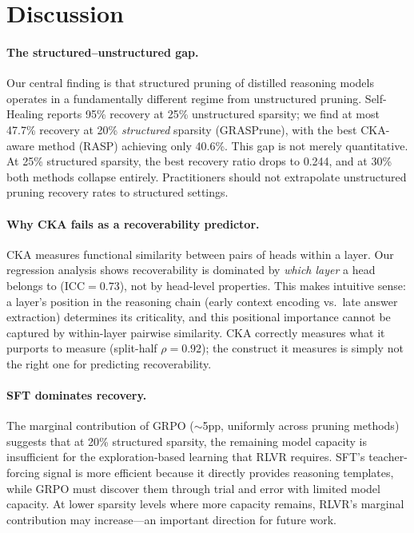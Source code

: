\documentclass[11pt,a4paper]{article}
\begin{document}
\section{Discussion}
\label{sec:discussion}

\paragraph{The structured--unstructured gap.}
Our central finding is that structured pruning of distilled reasoning models operates in a fundamentally different regime from unstructured pruning.
Self-Healing \cite{selfhealing2025} reports 95\% recovery at 25\% unstructured sparsity; we find at most 47.7\% recovery at 20\% \emph{structured} sparsity (GRASPrune), with the best CKA-aware method (RASP) achieving only 40.6\%.
This gap is not merely quantitative.
At 25\% structured sparsity, the best recovery ratio drops to 0.244, and at 30\% both methods collapse entirely.
Practitioners should not extrapolate unstructured pruning recovery rates to structured settings.

\paragraph{Why CKA fails as a recoverability predictor.}
CKA measures functional similarity between pairs of heads within a layer.
Our regression analysis shows recoverability is dominated by \emph{which layer} a head belongs to (ICC$=0.73$), not by head-level properties.
This makes intuitive sense: a layer's position in the reasoning chain (early context encoding vs.\ late answer extraction) determines its criticality, and this positional importance cannot be captured by within-layer pairwise similarity.
CKA correctly measures what it purports to measure (split-half $\rho = 0.92$); the construct it measures is simply not the right one for predicting recoverability.

\paragraph{SFT dominates recovery.}
The marginal contribution of GRPO ($\sim$5pp, uniformly across pruning methods) suggests that at 20\% structured sparsity, the remaining model capacity is insufficient for the exploration-based learning that RLVR requires.
SFT's teacher-forcing signal is more efficient because it directly provides reasoning templates, while GRPO must discover them through trial and error with limited model capacity.
At lower sparsity levels where more capacity remains, RLVR's marginal contribution may increase---an important direction for future work.
\end{document}

